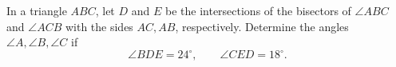 In a triangle $ABC$, let $D$ and $E$ be the intersections of the bisectors of $\angle ABC$ and $\angle ACB$ with the sides $AC, AB$, respectively. Determine the angles $\angle A, \angle B, \angle C$ if
\[ \angle BDE = 24^\circ, \qquad \angle CED = 18^\circ. \]
